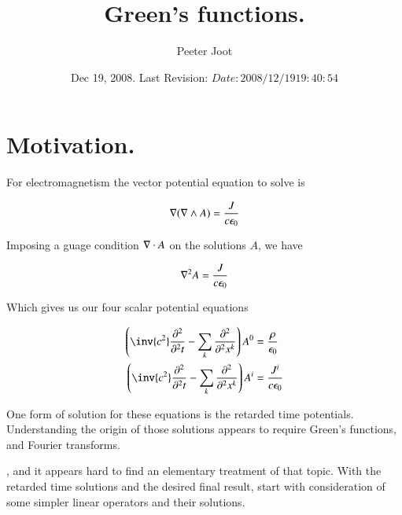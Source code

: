 \documentclass{article}
\title{ Green's functions. }
\author{Peeter Joot}
\date{ Dec 19, 2008.  Last Revision: $Date: 2008/12/19 19:40:54 $ }
\begin{document}
\maketitle{}

\section{ Motivation. }

For electromagnetism the vector potential equation to solve is

\begin{align*}
\nabla (\nabla \wedge A) = \frac{J}{c \epsilon_0}
\end{align*}

Imposing a guage condition $\nabla \cdot A$ on the solutions $A$, we have

\begin{align*}
\nabla^2 A = \frac{J}{c \epsilon_0}
\end{align*}

Which gives us our four scalar potential equations

\begin{align*}
\left(\inv{c^2}\PDsq{t}{} - \sum_k \PDsq{x^k}{} \right) A^0 &= \frac{\rho}{\epsilon_0} \\
\left(\inv{c^2}\PDsq{t}{} - \sum_k \PDsq{x^k}{} \right) A^i &= \frac{J^i}{c \epsilon_0} \\
\end{align*}

One form of solution for these equations is the retarded time potentials.
Understanding the origin of those solutions 
appears to require Green's functions, and Fourier transforms.



, and 
it appears
hard to find an elementary treatment of that topic.  With the retarded
time solutions and the desired final result, start with consideration
of some simpler linear operators and their solutions.


%



\end{document}
